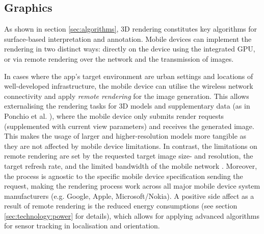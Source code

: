 \documentclass[review]{elsarticle}
\begin{document}





\subsection{Graphics}
\label{sec:technology:graphics}

As shown in section \ref{sec:algorithms}, 3D rendering constitutes key algorithms for surface-based interpretation and annotation. Mobile devices can implement the rendering in two distinct ways: directly on the device using the integrated \gls{GPU}, or via remote rendering over the network and the transmission of images.

In cases where the app's target environment are urban settings and locations of well-developed infrastructure, the mobile device can utilise the wireless network connectivity and apply \textit{remote rendering} for the image generation. This allows externalising the rendering tasks for 3D models and supplementary data (as in Ponchio et al. \cite{Ponchio2016}), where the mobile device only submits render requests (supplemented with current view parameters) and receives the generated image. This makes the usage of larger and higher-resolution models more tangible as they are not affected by mobile device limitations. In contrast, the limitations on remote rendering are set by the requested target image size- and resolution, the target refresh rate, and the limited bandwidth of the mobile network \cite{Ponchio2016,Evans2014}. Moreover, the process is agnostic to the specific mobile device specification sending the request, making the rendering process work across all major mobile device system manufacturers (e.g. Google, Apple, Microsoft/Nokia). A positive side affect as a result of remote rendering is the reduced energy consumptions (see section \ref{sec:technology:power} for details), which allows for applying advanced algorithms for sensor tracking in localisation and orientation.
\end{document}
